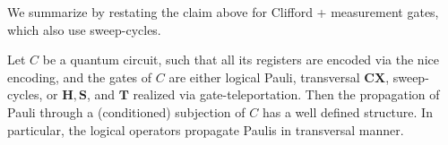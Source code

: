 We summarize by restating the claim above for Clifford + measurement gates, which also use sweep-cycles.
\begin{corollary}
\label{claim:pauliprop}  
Let $C$ be a quantum circuit, such that all its registers are encoded via the nice encoding, and the gates of $C$ are either logical Pauli, transversal $\mathbf{CX}$, sweep-cycles, or $\mathbf{H}, \mathbf{S}$, and $\mathbf{T}$ realized via gate-teleportation. Then the propagation of Pauli through a (conditioned) subjection of $C$ has a well defined structure. In particular, the logical operators propagate Paulis in transversal manner. 
\end{corollary}














